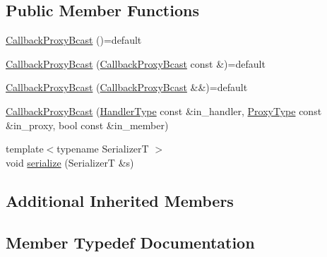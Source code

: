 \subsection*{Public Member Functions}
\begin{DoxyCompactItemize}
\item 
\hyperlink{structvt_1_1pipe_1_1callback_1_1_callback_proxy_bcast_a0f65df639ce4c3a9760b50107defbcad}{Callback\+Proxy\+Bcast} ()=default
\item 
\hyperlink{structvt_1_1pipe_1_1callback_1_1_callback_proxy_bcast_a196de6268c374af67345657d9cb2a8d4}{Callback\+Proxy\+Bcast} (\hyperlink{structvt_1_1pipe_1_1callback_1_1_callback_proxy_bcast}{Callback\+Proxy\+Bcast} const \&)=default
\item 
\hyperlink{structvt_1_1pipe_1_1callback_1_1_callback_proxy_bcast_adbcbe9ba02478e813d43b53b26ffedd0}{Callback\+Proxy\+Bcast} (\hyperlink{structvt_1_1pipe_1_1callback_1_1_callback_proxy_bcast}{Callback\+Proxy\+Bcast} \&\&)=default
\item 
\hyperlink{structvt_1_1pipe_1_1callback_1_1_callback_proxy_bcast_a046f6d76994fc3d87f3e92f9630690d0}{Callback\+Proxy\+Bcast} (\hyperlink{namespacevt_af64846b57dfcaf104da3ef6967917573}{Handler\+Type} const \&in\+\_\+handler, \hyperlink{structvt_1_1pipe_1_1callback_1_1_callback_proxy_bcast_a27c62cb9cbd1dcd3f135dcd98d98c991}{Proxy\+Type} const \&in\+\_\+proxy, bool const \&in\+\_\+member)
\item 
{\footnotesize template$<$typename SerializerT $>$ }\\void \hyperlink{structvt_1_1pipe_1_1callback_1_1_callback_proxy_bcast_acb68ed7d028b9286adb5758f680258cf}{serialize} (SerializerT \&s)
\end{DoxyCompactItemize}
\subsection*{Additional Inherited Members}


\subsection{Member Typedef Documentation}
\mbox{\label{structvt_1_1pipe_1_1callback_1_1_callback_proxy_bcast_ad65703bd011d36432495be4451ea61e7}} 
